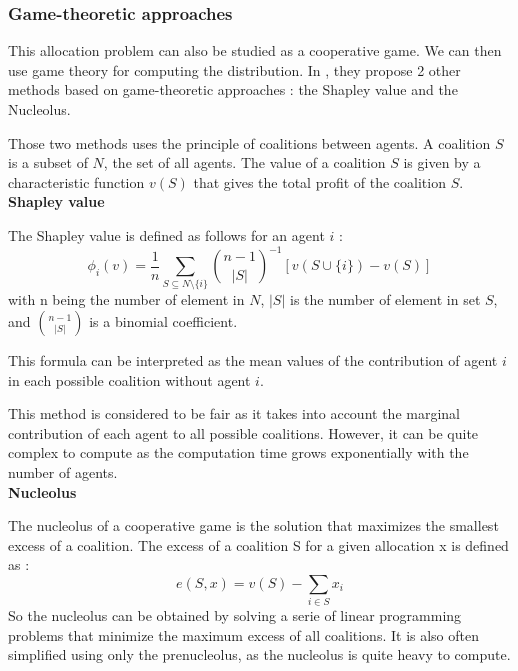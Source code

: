 \documentclass[12pt,a4paper]{article}
\begin{document}
\subsubsection{Game-theoretic approaches}

This allocation problem can also be studied as a cooperative game. We can then use game theory for computing the distribution. In \cite{article_1,these_sorel}, they propose 2 other methods based on game-theoretic approaches : the Shapley value and the Nucleolus. 

Those two methods uses the principle of coalitions between agents. A coalition $S$ is a subset of $N$, the set of all agents. The value of a coalition $S$ is given by a characteristic function $v(S)$ that gives the total profit of the coalition $S$. \\

\noindent\textbf{Shapley value}

The Shapley value \cite{article_1,these_sorel} is defined as follows for an agent $i$ :
\begin{equation}
    \phi_i (v) = \frac{1}{n}\sum_{S \subseteq N \setminus \{i\}}{\binom{n-1}{|S|}^{-1} [v(S \cup \{i\}) - v(S)]} \nonumber
\end{equation}
with n being the number of element in $N$, $|S|$ is the number of element in set $S$, and $\binom{n-1}{|S|}$ is a binomial coefficient.

This formula can be interpreted as the mean values of the contribution of agent $i$ in each possible coalition without agent $i$.

This method is considered to be fair as it takes into account the marginal contribution of each agent to all possible coalitions. However, it can be quite complex to compute as the computation time grows exponentially with the number of agents.\\

\noindent\textbf{Nucleolus}

The nucleolus \cite{article_1,these_sorel} of a cooperative game is the solution that maximizes the smallest excess of a coalition. The excess of a coalition S for a given allocation x is defined as :
\begin{equation}
    e(S,x) = v(S) - \sum_{i \in S}{x_i} \nonumber
\end{equation}
So the nucleolus can be obtained by solving a serie of linear programming problems that minimize the maximum excess of all coalitions. It is also often simplified using only the prenucleolus, as the nucleolus is quite heavy to compute.
\end{document}
